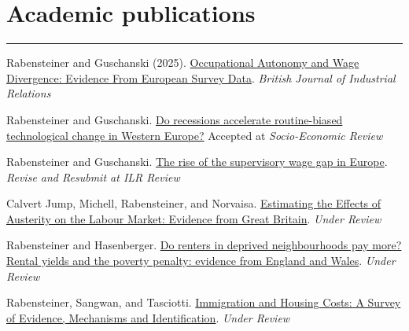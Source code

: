 \documentclass[letterpaper]{article}
\renewenvironment{itemize}{
  \begin{list}{}
    { \setlength{\itemsep}{5pt}
      \setlength{\parsep}{0pt}
      \setlength{\topsep}{0pt}
      \setlength{\leftmargin}{0em} } }{
  \end{list}}
\begin{document}
\section*{Academic publications}
\hrule
\begin{itemize}
    \item Rabensteiner and Guschanski (2025). \href{https://onlinelibrary.wiley.com/doi/pdf/10.1111/bjir.70003}{Occupational Autonomy and Wage Divergence: Evidence From European Survey Data}. \textit{British Journal of Industrial Relations} 
    \item Rabensteiner and Guschanski. \href{https://gala.gre.ac.uk/id/eprint/50671/7/50671%20RABENSTEINER_Do_Recessions_Accelerate_Routine-Biased_Technological_Change_In_Western_Europe_%28WP%29_2025.pdf}{Do recessions accelerate routine-biased technological change in Western Europe?} Accepted at \textit{Socio-Economic Review}
    \item Rabensteiner and Guschanski. \href{https://papers.ssrn.com/sol3/papers.cfm?abstract_id=6786318}{The rise of the supervisory wage gap in Europe}. \textit{Revise and Resubmit at \textit{ILR Review}} %
    \item Calvert Jump, Michell, Rabensteiner, and Norvaisa. \href{https://papers.ssrn.com/sol3/papers.cfm?abstract_id=5923063}{Estimating the Effects of Austerity on the Labour Market: Evidence from Great Britain}. \textit{Under Review} %
\item Rabensteiner and Hasenberger. \href{https://papers.ssrn.com/sol3/papers.cfm?abstract_id=7497881}{Do renters in deprived neighbourhoods pay more? Rental yields and the poverty penalty: evidence from England and Wales}. \textit{Under Review} %
    \item Rabensteiner, Sangwan, and Tasciotti. \href{https://papers.ssrn.com/sol3/papers.cfm?abstract_id=6786318}{Immigration and Housing Costs: A Survey of Evidence, Mechanisms and Identification}. \textit{Under Review} 

\end{itemize}
\end{document}
